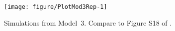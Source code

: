 \begin{figure}[!h]
\begin{knitrout}
\color{fgcolor}

{\centering \texttt{[image: figure/PlotMod3Rep-1]} 

}


\end{knitrout}
\caption{\label{fig:mod3rep}
Simulations from Model~3.
Compare to Figure S18 of \cite{lee20}.
}
\end{figure}



